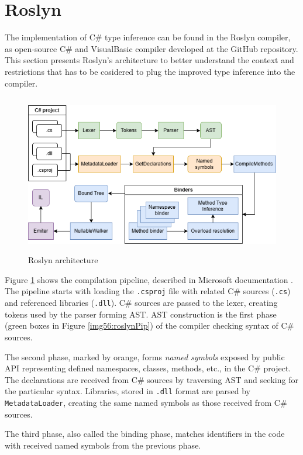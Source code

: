 \section{Roslyn}

The implementation of C\# type inference can be found in the Roslyn compiler, as open-source C\# and VisualBasic compiler developed at the GitHub repository. 
This section presents Roslyn’s architecture to better understand the context and restrictions that has to be cosidered to plug the improved type inference into the compiler.
\begin{figure}
\centering
\includegraphics[width=120mm, height=70mm]{./img/Roslyn_Arch.png}
\caption{Roslyn architecture}
\label{img15:roslynPip}
\end{figure}
\par
Figure \ref{img15:roslynPip} shows the compilation pipeline, described in Microsoft documentation \cite{online:roslynArchitecture}.
The pipeline starts with loading the \texttt{.csproj} file with related C\# sources (\texttt{.cs}) and referenced libraries (\texttt{.dll}).
C\# sources are passed to the lexer, creating tokens used by the parser forming \ac{AST}.
\ac{AST} construction is the first phase (green boxes in Figure \ref{img56:roslynPip}) of the compiler checking syntax of C\# sources.
\par
The second phase, marked by orange, forms \emph{named symbols} exposed by public API representing defined namespaces, classes, methods, etc., in the C\# project. 
The declarations are received from C\# sources by traversing AST and seeking for the particular syntax. Libraries, stored in \texttt{.dll} format are parsed by \texttt{MetadataLoader}, creating the same named symbols as those received from C\# sources.
\par
The third phase, also called the binding phase, matches identifiers in the code with received named symbols from the previous phase. 
